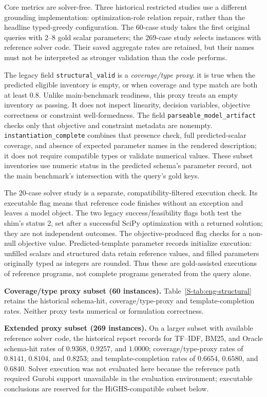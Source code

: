 \documentclass[pdflatex,sn-basic,Numbered]{sn-jnl}
\begin{document}
Core metrics are solver-free. Three historical restricted studies use a different grounding implementation: optimization-role relation repair, rather than the headline typed-greedy configuration. The 60-case study takes the first original queries with 2--8 gold scalar parameters; the 269-case study selects instances with reference solver code. Their saved aggregate rates are retained, but their names must not be interpreted as stronger validation than the code performs.

The legacy field \texttt{structural\_valid} is a \emph{coverage/type proxy}: it is true when the predicted eligible inventory is empty, or when coverage and type match are both at least 0.8. Unlike main-benchmark readiness, this proxy treats an empty inventory as passing. It does not inspect linearity, decision variables, objective correctness or constraint well-formedness. The field \texttt{parseable\_model\_artifact} checks only that objective and constraint metadata are nonempty. \texttt{instantiation\_complete} combines that presence check, full predicted-scalar coverage, and absence of expected parameter names in the rendered description; it does not require compatible types or validate numerical values. These subset inventories use numeric status in the predicted schema's parameter record, not the main benchmark's intersection with the query's gold keys.

The 20-case solver study is a separate, compatibility-filtered execution check. Its executable flag means that reference code finishes without an exception and leaves a model object. The two legacy success/feasibility flags both test the shim's status 2, set after a successful SciPy optimization with a returned solution; they are not independent outcomes. The objective-produced flag checks for a non-null objective value. Predicted-template parameter records initialize execution: unfilled scalars and structured data retain reference values, and filled parameters originally typed as integers are rounded. Thus these are gold-assisted executions of reference programs, not complete programs generated from the query alone.

\medskip\noindent\textbf{Coverage/type proxy subset (60 instances).}
Table~\ref{S-tab:eng-structural} retains the historical schema-hit, coverage/type-proxy and template-completion rates. Neither proxy tests numerical or formulation correctness.



\medskip\noindent\textbf{Extended proxy subset (269 instances).}
On a larger subset with available reference solver code, the historical report records for TF--IDF, BM25, and Oracle schema-hit rates of $0.9368$, $0.9257$, and $1.0000$; coverage/type-proxy rates of $0.8141$, $0.8104$, and $0.8253$; and template-completion rates of $0.6654$, $0.6580$, and $0.6840$. Solver execution was not evaluated here because the reference path required Gurobi support unavailable in the evaluation environment; executable conclusions are reserved for the HiGHS-compatible subset below.
\end{document}
